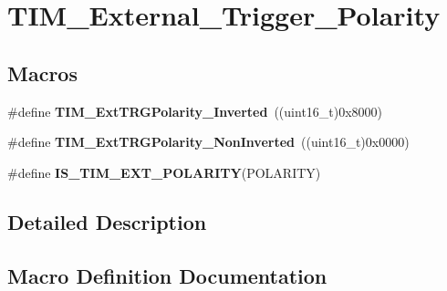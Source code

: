 \hypertarget{group___t_i_m___external___trigger___polarity}{}\section{T\+I\+M\+\_\+\+External\+\_\+\+Trigger\+\_\+\+Polarity}
\label{group___t_i_m___external___trigger___polarity}
\subsection*{Macros}
\begin{DoxyCompactItemize}
\item 
\#define {\bfseries T\+I\+M\+\_\+\+Ext\+T\+R\+G\+Polarity\+\_\+\+Inverted}~((uint16\+\_\+t)0x8000)\hypertarget{group___t_i_m___external___trigger___polarity_ga96f3959a02c0491ab8d65cfa384ce7e3}{}\label{group___t_i_m___external___trigger___polarity_ga96f3959a02c0491ab8d65cfa384ce7e3}

\item 
\#define {\bfseries T\+I\+M\+\_\+\+Ext\+T\+R\+G\+Polarity\+\_\+\+Non\+Inverted}~((uint16\+\_\+t)0x0000)\hypertarget{group___t_i_m___external___trigger___polarity_ga63fe7c58c491d2a812d5621b71c2d0c5}{}\label{group___t_i_m___external___trigger___polarity_ga63fe7c58c491d2a812d5621b71c2d0c5}

\item 
\#define {\bfseries I\+S\+\_\+\+T\+I\+M\+\_\+\+E\+X\+T\+\_\+\+P\+O\+L\+A\+R\+I\+TY}(P\+O\+L\+A\+R\+I\+TY)
\end{DoxyCompactItemize}


\subsection{Detailed Description}


\subsection{Macro Definition Documentation}
